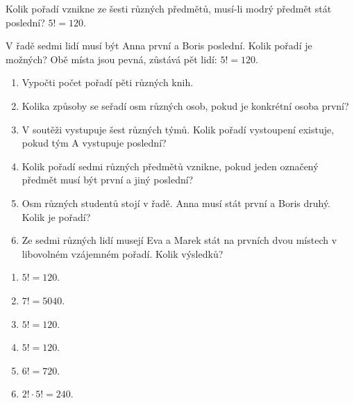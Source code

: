 \documentclass[11pt,a4paper]{article}
\begin{document}
\begin{zadaniReseniBox}[title={Samostatná práce 3}]
Kolik pořadí vznikne ze šesti různých předmětů, musí-li modrý předmět stát poslední?
\tcblower
$5!=120$.
\end{zadaniReseniBox}




\begin{zadaniReseniBox}[title={Rozšíření 1}]
V řadě sedmi lidí musí být Anna první a Boris poslední. Kolik pořadí je možných?
\tcblower
Obě místa jsou pevná, zůstává pět lidí: $5!=120$.
\end{zadaniReseniBox}





\begin{zadaniReseniBox}[title={Domácí úkol}]

\begin{enumerate}[label=\alph*),leftmargin=*,itemsep=2pt]

\item Vypočti počet pořadí pěti různých knih.
\item Kolika způsoby se seřadí osm různých osob, pokud je konkrétní osoba první?
\item V soutěži vystupuje šest různých týmů. Kolik pořadí vystoupení existuje, pokud tým A vystupuje poslední?
\item Kolik pořadí sedmi různých předmětů vznikne, pokud jeden označený předmět musí být první a jiný poslední?
\item Osm různých studentů stojí v řadě. Anna musí stát první a Boris druhý. Kolik je pořadí?
\item Ze sedmi různých lidí musejí Eva a Marek stát na prvních dvou místech v libovolném vzájemném pořadí. Kolik výsledků?

\end{enumerate}

\tcblower

\begin{enumerate}[label=\alph*),leftmargin=*,itemsep=2pt]

\item $5!=120$.
\item $7!=5040$.
\item $5!=120$.
\item $5!=120$.
\item $6!=720$.
\item $2!\cdot5!=240$.

\end{enumerate}

\end{zadaniReseniBox}


\end{document}
